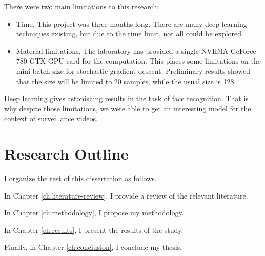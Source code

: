 There were two main limitations to this research:
\begin{itemize}
\item Time. This project was three months long. There are many deep learning techniques existing, but due to the time limit, not all could be explored.
\item Material limitations. The laboratory has provided a single NVIDIA GeForce 780 GTX GPU card for the computation. This places some limitations on the mini-batch size for stochastic gradient descent. Preliminary results showed that the size will be limited to 20 samples, while the usual size is 128.
\end{itemize}

Deep learning gives astonishing results in the task of face recognition. That is why despite those limitations, we were able to get an interesting model for the context of surveillance videos.

\section{Research Outline}

I organize the rest of this dissertation as follows.

In Chapter \ref{ch:literature-review}, I provide a review of the relevant literature.

In Chapter \ref{ch:methodology}, I propose my methodology.

In Chapter \ref{ch:results}, I present the results of the study.

Finally, in Chapter \ref{ch:conclusion}, I conclude my thesis.

\FloatBarrier